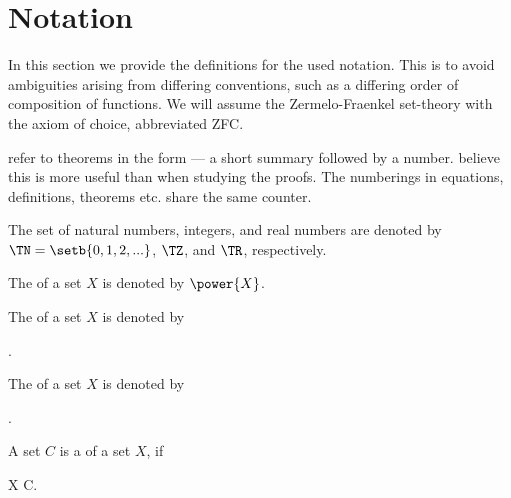 \documentclass[b5paper, english, oneside]{memoir}
\begin{document}
\ifarxiv


\else
\printbibliography
\fi

\appendix

\chapter{Notation}
\label{Notation}

In this section we provide the definitions for the used notation. This is to avoid ambiguities arising from differing conventions, such as a differing order of composition of functions. We will assume the Zermelo-Fraenkel set-theory with the axiom of choice, abbreviated ZFC.  

\We{} refer to theorems in the form  --- a short summary followed by a number. \We{} believe this is more useful than  when studying the proofs. The numberings in equations, definitions, theorems etc. share the same counter.

\begin{definition}[Numbers]
The set of natural numbers, integers, and real numbers are denoted by $\TN = \setb{0, 1, 2, ...}$, $\TZ$, and $\TR$, respectively. 
\end{definition}

\begin{definition}
The  of a set $X$ is denoted by $\power{X}$.
\end{definition}

\begin{definition}
The  of a set $X$ is denoted by
\begin{eqs}
 \coloneqq {}. 
\end{eqs}
\end{definition}

\begin{definition}
The  of a set $X$ is denoted by
\begin{eqs}
 \coloneqq {}. 
\end{eqs}
\end{definition}

\begin{definition}
A set $C$ is a  of a set $X$, if
\begin{eqs}
X \subset \bigcup C. 
\end{eqs}
\end{definition}
\end{document}

